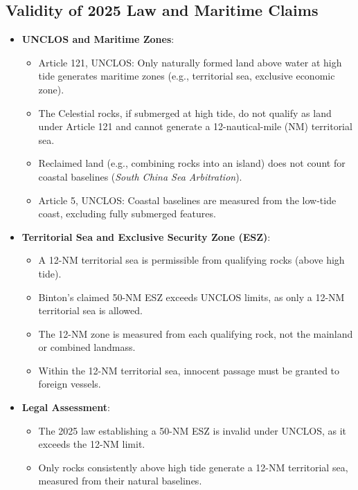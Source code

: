 \subsection{Validity of 2025 Law and Maritime Claims}
\begin{itemize}
    \item \textbf{UNCLOS and Maritime Zones}:
    \begin{itemize}
        \item Article 121, UNCLOS: Only naturally formed land above water at high tide generates maritime zones (e.g., territorial sea, exclusive economic zone).
        \item The Celestial rocks, if submerged at high tide, do not qualify as land under Article 121 and cannot generate a 12-nautical-mile (NM) territorial sea.
        \item Reclaimed land (e.g., combining rocks into an island) does not count for coastal baselines (\textit{South China Sea Arbitration}).
        \item Article 5, UNCLOS: Coastal baselines are measured from the low-tide coast, excluding fully submerged features.
    \end{itemize}
    \item \textbf{Territorial Sea and Exclusive Security Zone (ESZ)}:
    \begin{itemize}
        \item A 12-NM territorial sea is permissible from qualifying rocks (above high tide).
        \item Binton’s claimed 50-NM ESZ exceeds UNCLOS limits, as only a 12-NM territorial sea is allowed.
        \item The 12-NM zone is measured from each qualifying rock, not the mainland or combined landmass.
        \item Within the 12-NM territorial sea, innocent passage must be granted to foreign vessels.
    \end{itemize}
    \item \textbf{Legal Assessment}:
    \begin{itemize}
        \item The 2025 law establishing a 50-NM ESZ is invalid under UNCLOS, as it exceeds the 12-NM limit.
        \item Only rocks consistently above high tide generate a 12-NM territorial sea, measured from their natural baselines.
    \end{itemize}
\end{itemize}

